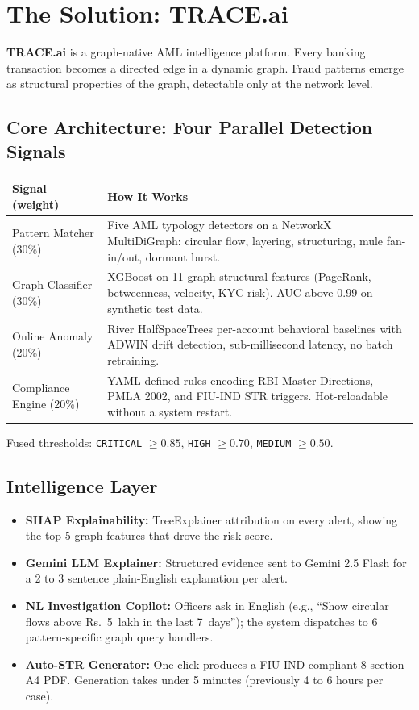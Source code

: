 \documentclass[10pt,a4paper]{article}
\begin{document}
\section{The Solution: TRACE.ai}

\textbf{TRACE.ai} is a graph-native AML intelligence platform. Every banking transaction becomes a directed edge in a dynamic graph. Fraud patterns emerge as structural properties of the graph, detectable only at the network level.

\subsection{Core Architecture: Four Parallel Detection Signals}

\begin{tabularx}{\linewidth}{L{2.8cm} X}
\toprule
\textbf{\color{traceblue}Signal (weight)} & \textbf{How It Works} \\
\midrule
Pattern Matcher (30\%) & Five AML typology detectors on a NetworkX MultiDiGraph: circular flow, layering, structuring, mule fan-in/out, dormant burst. \\[2pt]
Graph Classifier (30\%) & XGBoost on 11 graph-structural features (PageRank, betweenness, velocity, KYC risk). AUC above 0.99 on synthetic test data. \\[2pt]
Online Anomaly (20\%) & River HalfSpaceTrees per-account behavioral baselines with ADWIN drift detection, sub-millisecond latency, no batch retraining. \\[2pt]
Compliance Engine (20\%) & YAML-defined rules encoding RBI Master Directions, PMLA 2002, and FIU-IND STR triggers. Hot-reloadable without a system restart. \\
\bottomrule
\end{tabularx}

\smallskip
Fused thresholds: \texttt{CRITICAL} $\geq 0.85$, \texttt{HIGH} $\geq 0.70$, \texttt{MEDIUM} $\geq 0.50$.

\subsection{Intelligence Layer}

\begin{itemize}
  \item \textbf{SHAP Explainability:} TreeExplainer attribution on every alert, showing the top-5 graph features that drove the risk score.
  \item \textbf{Gemini LLM Explainer:} Structured evidence sent to Gemini 2.5 Flash for a 2 to 3 sentence plain-English explanation per alert.
  \item \textbf{NL Investigation Copilot:} Officers ask in English (e.g., ``Show circular flows above Rs.~5~lakh in the last 7~days''); the system dispatches to 6 pattern-specific graph query handlers.
  \item \textbf{Auto-STR Generator:} One click produces a FIU-IND compliant 8-section A4 PDF. Generation takes under 5 minutes (previously 4 to 6 hours per case).
\end{itemize}
\end{document}
